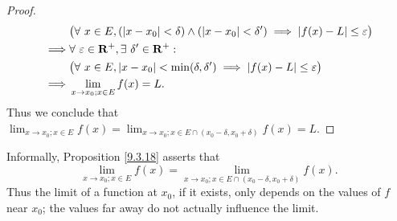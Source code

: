 \begin{proof}
\begin{align*}
                 & \big(\forall\ x \in E, (\abs*{x - x_0} < \delta) \land (\abs*{x - x_0} < \delta') \implies \abs*{f(x) - L} \leq \varepsilon\big)         \\
        \implies & \forall\ \varepsilon \in \mathbf{R}^+, \exists\ \delta' \in \mathbf{R}^+ :                                                               \\
                 & \big(\forall\ x \in E, \abs*{x - x_0} < \min(\delta, \delta') \implies \abs*{f(x) - L} \leq \varepsilon\big)                             \\
        \implies & \lim_{x \to x_0 ; x \in E} f(x) = L.
    \end{align*}
    Thus we conclude that \(\lim_{x \to x_0 ; x \in E} f(x) = \lim_{x \to x_0 ; x \in E \cap (x_0 - \delta, x_0 + \delta)} f(x) = L\).
\end{proof}

\begin{note}
    Informally, Proposition \ref{9.3.18} asserts that
    \[
        \lim_{x \to x_0 ; x \in E} f(x) = \lim_{x \to x_0 ; x \in E \cap (x_0 - \delta, x_0 + \delta)} f(x).
    \]
    Thus the limit of a function at \(x_0\), if it exists, only depends on the values of \(f\) near \(x_0\);
    the values far away do not actually influence the limit.
\end{note}

